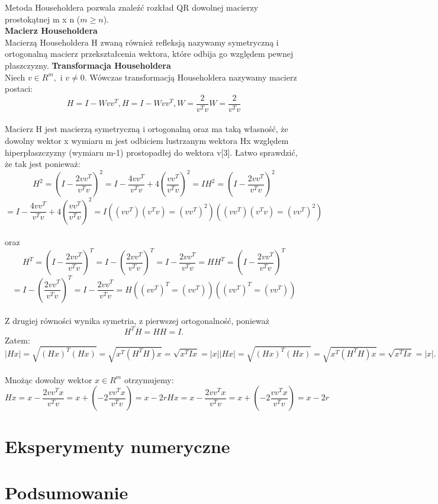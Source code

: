 \documentclass[10pt,a4paper]{report}
\begin{document}
\noindent Metoda Householdera pozwala znaleźć rozkład QR dowolnej macierzy prostokątnej m x n ($m\ge n$).\\

\noindent \textbf{Macierz Householdera}\\
\noindent Macierzą Householdera H zwaną również refleksją nazywamy symetryczną i ortogonalną macierz przekształcenia wektora, które odbija go względem pewnej płaszczyzny. 
\newpage
\noindent \textbf{Transformacja Householdera}\\
\noindent Niech  $v\in R^{m}, $ i $v\neq 0. $ Wówczas transformacją Householdera nazywamy macierz postaci:\\

$${\displaystyle H=I-Wvv^{T}, } {\displaystyle H=I-Wvv^{T}, }       {\displaystyle W={\frac {2}{v^{T}v}}} {\displaystyle W={\frac {2}{v^{T}v}}}$$ \\
Macierz H jest macierzą symetryczną i ortogonalną oraz ma taką własność, że dowolny wektor x wymiaru m jest odbiciem lustrzanym wektora Hx względem hiperpłaszczyzny (wymiaru m-1) prostopadłej do wektora v[3]. Łatwo sprawdzić, że tak jest ponieważ: \\

$${\displaystyle H^{2}=\left(I-{\frac {2vv^{T}}{v^{T}v}}\right)^{2}=I-{\frac {4vv^{T}}{v^{T}v}}+4\left({\frac {vv^{T}}{v^{T}v}}\right)^{2}=I} {\displaystyle H^{2}=\left(I-{\frac {2vv^{T}}{v^{T}v}}\right)^{2}}$$ \newline  $$= {I-{\frac {4vv^{T}}{v^{T}v}}+4\left({\frac {vv^{T}}{v^{T}v}}\right)^{2}=I}       {\displaystyle ((vv^{T})(v^{T}v)=(vv^{T})^{2})} {\displaystyle ((vv^{T})(v^{T}v)=(vv^{T})^{2})}$$\\
oraz\\

$${\displaystyle H^{T}=\left(I-{\frac {2vv^{T}}{v^{T}v}}\right)^{T}=I-\left({\frac {2vv^{T}}{v^{T}v}}\right)^{T}=I-{\frac {2vv^{T}}{v^{T}v}}=H} {\displaystyle H^{T}=\left(I-{\frac {2vv^{T}}{v^{T}v}}\right)^{T}}$$ \newline $$={I-\left({\frac {2vv^{T}}{v^{T}v}}\right)^{T}=I-{\frac {2vv^{T}}{v^{T}v}}=H}       {\displaystyle ((vv^{T})^{T}=(vv^{T}))} {\displaystyle ((vv^{T})^{T}=(vv^{T}))}$$\\
Z drugiej równości wynika symetria, z pierwszej ortogonalność, ponieważ $${\displaystyle H^{T}H=HH=I}. $$ Zatem:\\

$${\displaystyle |Hx|={\sqrt {(Hx)^{T}(Hx)}}={\sqrt {x^{T}(H^{T}H)x}}={\sqrt {x^{T}Ix}}=|x|} {\displaystyle |Hx|={\sqrt {(Hx)^{T}(Hx)}}={\sqrt {x^{T}(H^{T}H)x}}={\sqrt {x^{T}Ix}}=|x|}. $$\\
Mnożąc dowolny wektor ${\displaystyle x\in R^{m}}$ otrzymujemy:\\

$${\displaystyle Hx=x-{\frac {2vv^{T}x}{v^{T}v}}=x+(-2{\frac {vv^{T}x}{v^{T}v}})=x-2r} {\displaystyle Hx=x-{\frac {2vv^{T}x}{v^{T}v}}=x+(-2{\frac {vv^{T}x}{v^{T}v}})=x-2r}$$





\chapter{Eksperymenty numeryczne}

\chapter{Podsumowanie}
\end{document}
